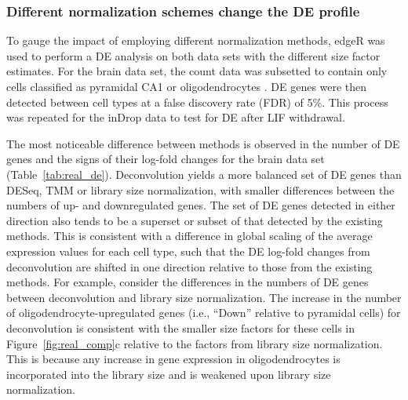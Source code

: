 \documentclass{bmcart}
\begin{document}

\subsubsection*{Different normalization schemes change the DE profile}
To gauge the impact of employing different normalization methods, edgeR was used to perform a DE analysis on both data sets with the different size factor estimates. 
For the brain data set, the count data was subsetted to contain only cells classified as pyramidal CA1 or oligodendrocytes \cite{zeisel2015brain}.
DE genes were then detected between cell types at a false discovery rate (FDR) of 5\%.
This process was repeated for the inDrop data to test for DE after LIF withdrawal.

The most noticeable difference between methods is observed in the number of DE genes and the signs of their log-fold changes for the brain data set (Table~\ref{tab:real_de}).
Deconvolution yields a more balanced set of DE genes than DESeq, TMM or library size normalization, with smaller differences between the numbers of up- and downregulated genes.
The set of DE genes detected in either direction also tends to be a superset or subset of that detected by the existing methods.
This is consistent with a difference in global scaling of the average expression values for each cell type, 
    such that the DE log-fold changes from deconvolution are shifted in one direction relative to those from the existing methods.
For example, consider the differences in the numbers of DE genes between deconvolution and library size normalization.
The increase in the number of oligodendrocyte-upregulated genes (i.e., ``Down'' relative to pyramidal cells) for deconvolution is consistent with the smaller size factors for these cells in Figure~\ref{fig:real_comp}c relative to the factors from library size normalization.
This is because any increase in gene expression in oligodendrocytes is incorporated into the library size and is weakened upon library size normalization.
\end{document}
